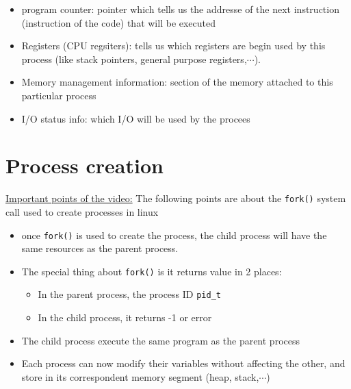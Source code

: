 \documentclass[12pt,a4paper]{book}
\begin{document}
\begin{itemize}


\item program counter: pointer which tells us the addresse of the next instruction (instruction of the code) that will be executed

\item Registers (CPU regsiters): tells us which registers are begin used by this process (like stack pointers, general purpose registers,$\cdots$).

\item Memory management information: section of the memory attached to this particular process

\item I/O status info: which I/O will be used by the procees


\end{itemize}


\newpage
\section{Process creation}

\underline{Important points of the video:} The following points are about the \verb|fork()| system call used to create processes in linux


\begin{itemize}

\item once \verb|fork()| is used to create the process, the child process will have the same resources as the parent process.

\item The special thing about \verb|fork()| is it returns value in 2 places:

    \begin{itemize}
        \item In the parent process, the process ID \verb|pid_t|

        \item In the child process, it returns -1 or error
        
    \end{itemize}

\item The child process execute the same program as the parent process

\item Each process can now modify their variables without affecting the other, and store in its correspondent memory segment (heap, stack,$\cdots$) 

\end{itemize}
\end{document}

